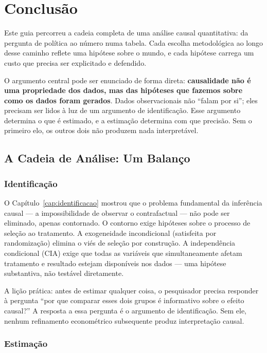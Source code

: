 \chapter{Conclusão}
\label{cap:conclusao}

Este guia percorreu a cadeia completa de uma análise causal quantitativa:
da pergunta de política ao número numa tabela. Cada escolha metodológica ao longo desse caminho reflete uma hipótese sobre o mundo, e cada hipótese carrega um custo que precisa ser explicitado e defendido.

O argumento central pode ser enunciado de forma direta: \textbf{causalidade não é uma propriedade dos dados, mas das hipóteses que fazemos sobre como os dados foram gerados}. Dados observacionais não ``falam por si''; eles precisam ser lidos à luz de um argumento de identificação. Esse argumento determina o que é estimado, e a estimação determina com que precisão. Sem o primeiro elo, os outros dois não produzem nada interpretável.


\section{A Cadeia de Análise: Um Balanço}

\subsection*{Identificação}

O Capítulo~\ref{cap:identificacao} mostrou que o problema fundamental da
inferência causal --- a impossibilidade de observar o contrafactual --- não
pode ser eliminado, apenas contornado. O contorno exige hipóteses sobre o
processo de seleção ao tratamento. A exogeneidade incondicional (satisfeita
por randomização) elimina o viés de seleção por construção. A independência
condicional (CIA) exige que todas as variáveis que simultaneamente afetam
tratamento e resultado estejam disponíveis nos dados --- uma hipótese
substantiva, não testável diretamente.

A lição prática: antes de estimar qualquer coisa, o pesquisador precisa
responder à pergunta ``por que comparar esses dois grupos é informativo sobre
o efeito causal?'' A resposta a essa pergunta é o argumento de identificação.
Sem ele, nenhum refinamento econométrico subsequente produz interpretação
causal.

\subsection*{Estimação}

